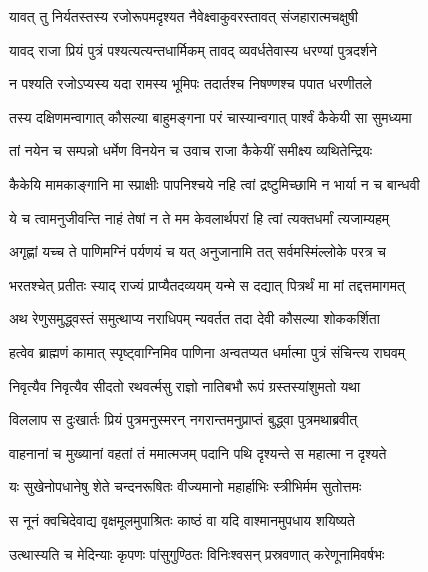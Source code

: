
\twolineshloka
{यावत् तु निर्यतस्तस्य रजोरूपमदृश्यत}
{नैवेक्ष्वाकुवरस्तावत् संजहारात्मचक्षुषी} %

\twolineshloka
{यावद् राजा प्रियं पुत्रं पश्यत्यत्यन्तधार्मिकम्}
{तावद् व्यवर्धतेवास्य धरण्यां पुत्रदर्शने} %

\twolineshloka
{न पश्यति रजोऽप्यस्य यदा रामस्य भूमिपः}
{तदार्तश्च निषण्णश्च पपात धरणीतले} %

\twolineshloka
{तस्य दक्षिणमन्वागात् कौसल्या बाहुमङ्गना}
{परं चास्यान्वगात् पार्श्वं कैकेयी सा सुमध्यमा} %

\twolineshloka
{तां नयेन च सम्पन्नो धर्मेण विनयेन च}
{उवाच राजा कैकेयीं समीक्ष्य व्यथितेन्द्रियः} %

\twolineshloka
{कैकेयि मामकाङ्गानि मा स्प्राक्षीः पापनिश्चये}
{नहि त्वां द्रष्टुमिच्छामि न भार्या न च बान्धवी} %

\twolineshloka
{ये च त्वामनुजीवन्ति नाहं तेषां न ते मम}
{केवलार्थपरां हि त्वां त्यक्तधर्मां त्यजाम्यहम्} %

\twolineshloka
{अगृह्णां यच्च ते पाणिमग्निं पर्यणयं च यत्}
{अनुजानामि तत् सर्वमस्मिंल्लोके परत्र च} %

\twolineshloka
{भरतश्चेत् प्रतीतः स्याद् राज्यं प्राप्यैतदव्ययम्}
{यन्मे स दद्यात् पित्रर्थं मा मां तद्दत्तमागमत्} %

\twolineshloka
{अथ रेणुसमुद्ध्वस्तं समुत्थाप्य नराधिपम्}
{न्यवर्तत तदा देवी कौसल्या शोककर्शिता} %

\twolineshloka
{हत्वेव ब्राह्मणं कामात् स्पृष्ट्वाग्निमिव पाणिना}
{अन्वतप्यत धर्मात्मा पुत्रं संचिन्त्य राघवम्} %

\twolineshloka
{निवृत्यैव निवृत्यैव सीदतो रथवर्त्मसु}
{राज्ञो नातिबभौ रूपं ग्रस्तस्यांशुमतो यथा} %

\twolineshloka
{विललाप स दुःखार्तः प्रियं पुत्रमनुस्मरन्}
{नगरान्तमनुप्राप्तं बुद्ध्वा पुत्रमथाब्रवीत्} %

\twolineshloka
{वाहनानां च मुख्यानां वहतां तं ममात्मजम्}
{पदानि पथि दृश्यन्ते स महात्मा न दृश्यते} %

\twolineshloka
{यः सुखेनोपधानेषु शेते चन्दनरूषितः}
{वीज्यमानो महार्हाभिः स्त्रीभिर्मम सुतोत्तमः} %

\twolineshloka
{स नूनं क्वचिदेवाद्य वृक्षमूलमुपाश्रितः}
{काष्ठं वा यदि वाश्मानमुपधाय शयिष्यते} %

\twolineshloka
{उत्थास्यति च मेदिन्याः कृपणः पांसुगुण्ठितः}
{विनिःश्वसन् प्रस्रवणात् करेणूनामिवर्षभः} %

